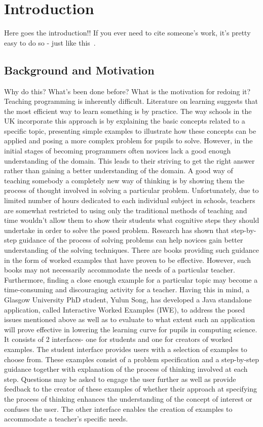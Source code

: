 \label{part:introduction}

\chapter{Introduction}
\label{chap:intro}
\onehalfspacing

Here goes the introduction!! If you ever need to cite someone's work, it's pretty easy to do so - just like this~\cite{hughes2009}.

\section{Background and Motivation}
Why do this? What's been done before? What is the motivation for redoing it?
Teaching programming is inherently difficult. Literature on learning suggests that the most efficient way to learn something is by practice. The way schools in the UK incorporate this approach is by explaining the basic concepts related to a specific topic, presenting simple examples to illustrate how these concepts can be applied and posing a more complex problem for pupils to solve. However, in the initial stages of becoming programmers often novices lack a good enough understanding of the domain. This leads to their striving to get the right answer rather than gaining a better understanding of the domain.
A good way of teaching somebody a completely new way of thinking is by showing them the process of thought involved in solving a particular problem. Unfortunately, due to limited number of hours dedicated to each individual subject in schools, teachers are somewhat restricted to using only the traditional methods of teaching and time wouldn’t allow them to show their students what cognitive steps they should undertake in order to solve the posed problem.
Research has shown that step-by-step guidance of the process of solving problems can help novices gain better understanding of the solving techniques. There are books providing such guidance in the form of worked examples that have proven to be effective. However, such books may not necessarily accommodate the needs of a particular teacher. Furthermore, finding a close enough example for a particular topic may become a time-consuming and discouraging activity for a teacher. 
Having this in mind, a Glasgow University PhD student, Yulun Song, has developed a Java standalone application, called Interactive Worked Examples (IWE), to address the posed issues mentioned above as well as to evaluate to what extent such an application will prove effective in lowering the learning curve for pupils in computing science. It consists of 2 interfaces- one for students and one for creators of worked examples. The student interface provides users with a selection of examples to choose from. These examples consist of a problem specification and a step-by-step guidance together with explanation of the process of thinking involved at each step. Questions may be asked to engage the user further as well as provide feedback to the creator of these examples of whether their approach at specifying the process of thinking enhances the understanding of the concept of interest or confuses the user. The other interface enables the creation of examples to accommodate a teacher’s specific needs.
